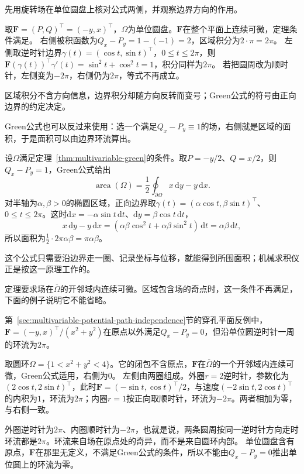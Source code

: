 先用旋转场在单位圆盘上核对公式两侧，并观察边界方向的作用。
\begin{example}[旋转场在单位圆盘上的Green公式]
\label{ex:analysis-rotation-field-green-disk}
取$\bm F=(P,Q)^\top=(-y,x)^\top$，$\Omega$为单位圆盘。$\bm F$在整个平面上连续可微，定理条件满足。
右侧被积函数为$Q_x-P_y=1-(-1)=2$，区域积分为$2\cdot\pi=2\pi$。
左侧取逆时针边界$\gamma(t)=(\cos t,\sin t)^\top$，$0\leq t\leq2\pi$，则$\bm F(\gamma(t))^\top\gamma'(t)=\sin^2t+\cos^2t=1$，积分同样为$2\pi$。
若把圆周改为顺时针，左侧变为$-2\pi$，右侧仍为$2\pi$，等式不再成立。
\end{example}
区域积分不含方向信息，边界积分却随方向反转而变号；Green公式的符号由正向边界的约定决定。

Green公式也可以反过来使用：选一个满足$Q_x-P_y\equiv1$的场，右侧就是区域的面积，于是面积可以由边界环流算出。
\begin{example}[用边界计算面积]
\label{ex:analysis-green-area-formula}
设$\Omega$满足定理~\ref{thm:multivariable-green}的条件。取$P=-y/2$、$Q=x/2$，则$Q_x-P_y=1$，Green公式给出
\[
 \operatorname{area}(\Omega)=\frac12\oint_{\partial\Omega}x\,\mathrm dy-y\,\mathrm dx.
\]
对半轴为$\alpha,\beta>0$的椭圆区域，正向边界取$\gamma(t)=(\alpha\cos t,\beta\sin t)^\top$、$0\leq t\leq2\pi$。这时$\mathrm dx=-\alpha\sin t\,\mathrm dt$、$\mathrm dy=\beta\cos t\,\mathrm dt$，
\[
 x\,\mathrm dy-y\,\mathrm dx=(\alpha\beta\cos^2t+\alpha\beta\sin^2t)\,\mathrm dt=\alpha\beta\,\mathrm dt,
\]
所以面积为$\frac12\cdot2\pi\alpha\beta=\pi\alpha\beta$。
\end{example}
这个公式只需要沿边界走一圈、记录坐标与位移，就能得到所围面积；机械求积仪正是按这一原理工作的。

定理要求场在$\overline\Omega$的开邻域内连续可微。区域包含场的奇点时，这一条件不再满足，下面的例子说明它不能省略。
\begin{example}[有孔区域上的涡旋场]
\label{ex:analysis-annulus-vortex-green}
第~\ref{sec:multivariable-potential-path-independence}节的穿孔平面反例中，$\bm F=(-y,x)^\top/(x^2+y^2)$在原点以外满足$Q_x-P_y=0$，但沿单位圆逆时针一周的环流为$2\pi$。

取圆环$\Omega=\{1<x^2+y^2<4\}$。它的闭包不含原点，$\bm F$在$\overline\Omega$的一个开邻域内连续可微，Green公式适用，右侧为$0$。
左侧由两圈组成。外圈$r=2$逆时针，参数化为$(2\cos t,2\sin t)^\top$，此时$\bm F=(-\sin t,\cos t)^\top/2$，与速度$(-2\sin t,2\cos t)^\top$的内积为$1$，环流为$2\pi$；内圈$r=1$按正向取顺时针，环流为$-2\pi$。两者相加为零，与右侧一致。
\end{example}
外圈逆时针为$2\pi$、内圈顺时针为$-2\pi$，也就是说，两条圆周按同一逆时针方向走时环流都是$2\pi$。环流来自场在原点处的奇异，而不是来自圆环内部。
单位圆盘含有原点，$\bm F$在那里无定义，不满足Green公式的条件，所以不能由$Q_x-P_y=0$推出单位圆上的环流为零。

